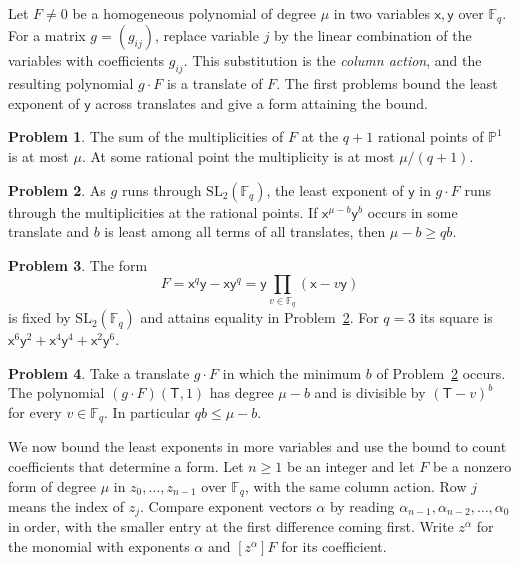 \documentclass[reqno]{amsart}
\theoremstyle{plain}
\theoremstyle{definition}
\newtheorem{problem}{Problem}[section]
\theoremstyle{remark}
\newcommand{\F}{\mathbb{F}}
\newcommand{\SL}{\mathrm{SL}}
\newcommand{\xv}{\mathsf{x}}
\newcommand{\yv}{\mathsf{y}}
\newcommand{\Tv}{\mathsf{T}}
\begin{document}
Let \(F\ne0\) be a homogeneous polynomial of degree \(\mu\) in two variables \(\xv,\yv\) over \(\F_q\).  For a matrix \(g=(g_{ij})\), replace variable \(j\) by the linear combination of the variables with coefficients \(g_{ij}\).  This substitution is the \emph{column action}, and the resulting polynomial \(g\cdot F\) is a translate of \(F\).  The first problems bound the least exponent of \(\yv\) across translates and give a form attaining the bound.

\begin{problem}\label{pr:multiplicities}
The sum of the multiplicities of \(F\) at the \(q+1\) rational points of \(\mathbb{P}^1\) is at most \(\mu\).  At some rational point the multiplicity is at most \(\mu/(q+1)\).
\end{problem}

\begin{problem}\label{pr:one-letter}
As \(g\) runs through \(\SL_2(\F_q)\), the least exponent of \(\yv\) in \(g\cdot F\) runs through the multiplicities at the rational points.  If \(\xv^{\mu-b}\yv^b\) occurs in some translate and \(b\) is least among all terms of all translates, then \(\mu-b\ge qb\).
\end{problem}

\begin{problem}\label{pr:invariant-one}
The form
\[
  F=\xv^q\yv-\xv\yv^q=\yv\prod_{v\in\F_q}(\xv-v\yv)
\]
is fixed by \(\SL_2(\F_q)\) and attains equality in Problem~\ref{pr:one-letter}.  For \(q=3\) its square is \(\xv^6\yv^2+\xv^4\yv^4+\xv^2\yv^6\).
\end{problem}

\begin{problem}\label{pr:dehomogenize}
Take a translate \(g\cdot F\) in which the minimum \(b\) of Problem~\ref{pr:one-letter} occurs.  The polynomial \((g\cdot F)(\Tv,1)\) has degree \(\mu-b\) and is divisible by \((\Tv-v)^b\) for every \(v\in\F_q\).  In particular \(qb\le\mu-b\).
\end{problem}

We now bound the least exponents in more variables and use the bound to count coefficients that determine a form.  Let \(n\ge1\) be an integer and let \(F\) be a nonzero form of degree \(\mu\) in \(z_0,\dots,z_{n-1}\) over \(\F_q\), with the same column action.  Row \(j\) means the index of \(z_j\).  Compare exponent vectors \(\alpha\) by reading \(\alpha_{n-1},\alpha_{n-2},\dots,\alpha_0\) in order, with the smaller entry at the first difference coming first.  Write \(z^\alpha\) for the monomial with exponents \(\alpha\) and \([z^\alpha]F\) for its coefficient.
\end{document}
